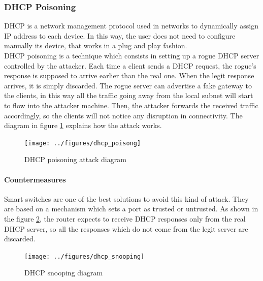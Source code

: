 \documentclass[final]{article}
\begin{document}
\subsubsection{DHCP Poisoning}
\ac{DHCP} is a network management protocol used in networks to dynamically assign IP address to each device.
In this way, the user does not need to configure manually its device, that works in a plug and play fashion.\\
\ac{DHCP} poisoning is a technique which consists in setting up a rogue \ac{DHCP}  server controlled by the attacker.
Each time a client sends a \ac{DHCP} request, the rogue's response is supposed to arrive earlier than the real one.
When the legit response arrives, it is simply discarded.
The rogue server can advertise a fake gateway to the clients, in this way all the traffic going away from the local subnet will start to flow into the attacker machine.
Then, the attacker forwards the received traffic accordingly, so the clients will not notice any disruption in connectivity.
The diagram in figure \ref{dhcp_poisoning} explains how the attack works.
\begin{figure}
\center
\texttt{[image: ../figures/dhcp\_poisong]}
\caption{DHCP poisoning attack diagram}
\label{dhcp_poisoning}
\end{figure}
\paragraph{Countermeasures}
Smart switches are one of the best solutions to avoid this kind of attack.
They are based on a mechanism which sets a port as trusted or untrusted.
As shown in the figure \ref{dhcp_snooping}, the router expects to receive DHCP responses only from the real DHCP server,
so all the responses which do not come from the legit server are discarded.

\begin{figure}
\center
\texttt{[image: ../figures/dhcp\_snooping]}
\caption{DHCP snooping diagram}
\label{dhcp_snooping}
\end{figure}
\newpage
\end{document}

